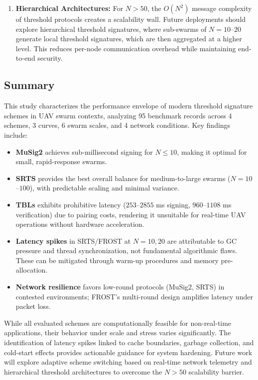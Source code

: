 \begin{enumerate}
    \item \textbf{Hierarchical Architectures:} For $N > 50$, the $O(N^2)$ message complexity of threshold protocols creates a scalability wall. Future deployments should explore hierarchical threshold signatures, where sub-swarms of $N=10$--$20$ generate local threshold signatures, which are then aggregated at a higher level. This reduces per-node communication overhead while maintaining end-to-end security.
\end{enumerate}

\subsection{Summary}
\label{subsec:summary}

This study characterizes the performance envelope of modern threshold signature schemes in UAV swarm contexts, analyzing 95 benchmark records across 4 schemes, 3 curves, 6 swarm scales, and 4 network conditions. Key findings include:

\begin{itemize}
    \item \textbf{MuSig2} achieves sub-millisecond signing for $N \leq 10$, making it optimal for small, rapid-response swarms.
    \item \textbf{SRTS} provides the best overall balance for medium-to-large swarms ($N = 10$--$100$), with predictable scaling and minimal variance.
    \item \textbf{TBLs} exhibits prohibitive latency ($253$--$2855$ ms signing, $960$--$1108$ ms verification) due to pairing costs, rendering it unsuitable for real-time UAV operations without hardware acceleration.
    \item \textbf{Latency spikes} in SRTS/FROST at $N=10, 20$ are attributable to GC pressure and thread synchronization, not fundamental algorithmic flaws. These can be mitigated through warm-up procedures and memory pre-allocation.
    \item \textbf{Network resilience} favors low-round protocols (MuSig2, SRTS) in contested environments; FROST's multi-round design amplifies latency under packet loss.
\end{itemize}

While all evaluated schemes are computationally feasible for non-real-time applications, their behavior under scale and stress varies significantly. The identification of latency spikes linked to cache boundaries, garbage collection, and cold-start effects provides actionable guidance for system hardening. Future work will explore adaptive scheme switching based on real-time network telemetry and hierarchical threshold architectures to overcome the $N > 50$ scalability barrier.
